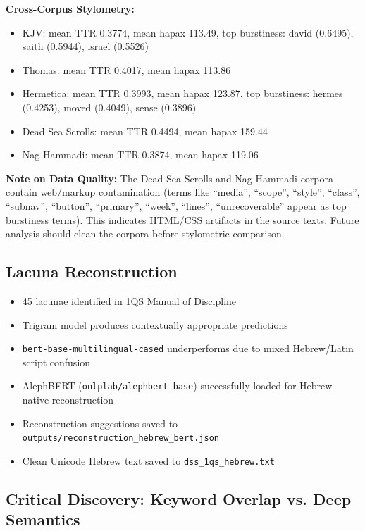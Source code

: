 \documentclass[11pt]{article}
\begin{document}
\textbf{Cross-Corpus Stylometry:}
\begin{itemize}
    \item KJV: mean TTR 0.3774, mean hapax 113.49, top burstiness: david (0.6495), saith (0.5944), israel (0.5526)
    \item Thomas: mean TTR 0.4017, mean hapax 113.86
    \item Hermetica: mean TTR 0.3993, mean hapax 123.87, top burstiness: hermes (0.4253), moved (0.4049), sense (0.3896)
    \item Dead Sea Scrolls: mean TTR 0.4494, mean hapax 159.44
    \item Nag Hammadi: mean TTR 0.3874, mean hapax 119.06
\end{itemize}

\textbf{Note on Data Quality:} The Dead Sea Scrolls and Nag Hammadi corpora contain web/markup contamination (terms like ``media'', ``scope'', ``style'', ``class'', ``subnav'', ``button'', ``primary'', ``week'', ``lines'', ``unrecoverable'' appear as top burstiness terms). This indicates HTML/CSS artifacts in the source texts. Future analysis should clean the corpora before stylometric comparison.

\subsection{Lacuna Reconstruction}

\begin{itemize}
    \item 45 lacunae identified in 1QS Manual of Discipline
    \item Trigram model produces contextually appropriate predictions
    \item \texttt{bert-base-multilingual-cased} underperforms due to mixed Hebrew/Latin script confusion
    \item AlephBERT (\texttt{onlplab/alephbert-base}) successfully loaded for Hebrew-native reconstruction
    \item Reconstruction suggestions saved to \texttt{outputs/reconstruction\_hebrew\_bert.json}
    \item Clean Unicode Hebrew text saved to \texttt{dss\_1qs\_hebrew.txt}
\end{itemize}

\subsection{Critical Discovery: Keyword Overlap vs. Deep Semantics}
\end{document}
